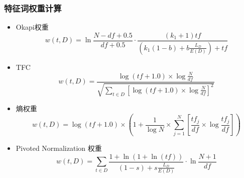 \documentclass[CJKutf8, table]{beamer}
\begin{document}
\begin{CJK}{UTF8}{gbsn}
\begin{frame}
  \frametitle{特征词权重计算}
  \begin{tiny}
    \begin{block}{}
      \begin{itemize}
        \item{Okapi权重\cite{Robertson}
          $$
          w(t, D) = \ln \frac{N-df+0.5}{df + 0.5}\cdot
          \frac{(k_1 + 1) tf}{(k_1(1-b)+b\frac{L_D}{E(D)})+tf}
          $$}
          \pause
        \item{TFC
          $$
          w(t, D) = \frac{\log (tf + 1.0) \times \log \frac{N}{df}}{\sqrt{\sum_{t \in
          D}\left[\log (tf + 1.0) \times \log \frac{N}{df}\right]^2}}
          $$}
          \pause
        \item{熵权重
          $$
          w(t, D) = \log (tf + 1.0) \times \left (1 + \frac{1}{\log N} \times
          \sum_{j = 1}^N\left [\frac{tf_j}{df} \times \log
          \frac{tf_j}{df}\right]\right)
          $$}
          \pause
        \item{Pivoted Normalization 权重\cite{Singhal}
          $$
          w(t, D) = \sum_{t\in D} \frac{1 + \ln (1+ \ln(tf))}{(1-s)+s
          \frac{L_D}{E(D)}}\cdot \ln \frac{N+1}{df}
          $$}
        \end{itemize}
    \end{block}
  \end{tiny}
\end{frame}


\end{CJK}
\end{document}

